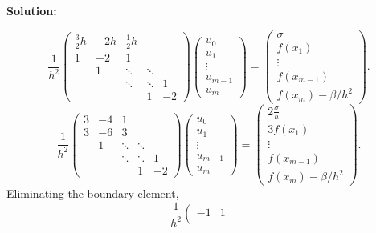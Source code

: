 \documentclass[letterpaper,12pt]{article}
\begin{document}
\begin{enumerate}
\begin{enumerate}
{\bf Solution:}

\[
\frac{1}{h^2} \left( \begin{array}{ccccc}
\frac{3}{2}h & -2h  & \frac{1}{2}h       &        &      \\
1  & -2 & 1      &        &      \\
   & 1  & \ddots & \ddots &      \\
   &    & \ddots & \ddots & 1    \\
   &    &        & 1      & -2 \end{array} \right)
\left( \begin{array}{c} u_0 \\ u_1 \\ \vdots \\ u_{m-1} \\ u_{m} \end{array} 
\right) =
\left( \begin{array}{c} \sigma  \\ f( x_1 ) \\ \vdots \\ 
f( x_{m-1} ) \\ f( x_m ) - \beta / h^2 \end{array} \right) .
\]
\[
\frac{1}{h^2} \left( \begin{array}{ccccc}
3 & -4  & 1       &        &      \\
3  & -6 & 3      &        &      \\
   & 1  & \ddots & \ddots &      \\
   &    & \ddots & \ddots & 1    \\
   &    &        & 1      & -2 \end{array} \right)
\left( \begin{array}{c} u_0 \\ u_1 \\ \vdots \\ u_{m-1} \\ u_{m} \end{array} 
\right) =
\left( \begin{array}{c} 2 \frac{\sigma}{h}  \\ 3f( x_1 ) \\ \vdots \\ 
f( x_{m-1} ) \\ f( x_m ) - \beta / h^2 \end{array} \right) .
\]
Eliminating the boundary element,
\[
\frac{1}{h^2} \left( \begin{array}{ccccc}
 -1 & 1      &        &      \\

\end{array}\]
\end{enumerate}
\end{enumerate}
\end{document}
